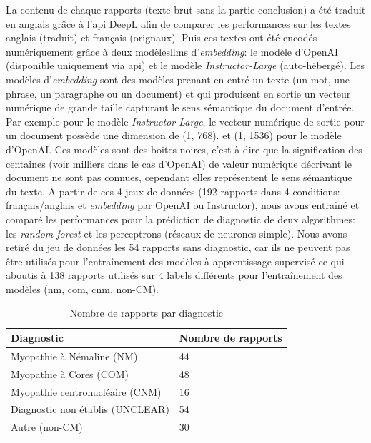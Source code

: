 La contenu de chaque rapports (texte brut sans la partie conclusion) a été traduit en anglais grâce à l'\gls{api} DeepL afin de comparer les performances sur les textes anglais (traduit) et français (orignaux). Puis ces textes ont été encodés numériquement grâce à deux modèles\gls{llms} d'\textit{embedding}: le modèle d'OpenAI (disponible uniquement via \gls{api}) et le modèle \textit{Instructor-Large} (auto-hébergé). Les modèles d'\textit{embedding} sont des modèles prenant en entré un texte (un mot, une phrase, un paragraphe ou un document) et qui produisent en sortie un vecteur numérique de grande taille capturant le sens sémantique du document d'entrée. Par exemple pour le modèle \textit{Instructor-Large}, le vecteur numérique de sortie pour un document possède une dimension de (1, 768). et (1, 1536) pour le modèle d'OpenAI. Ces modèles sont des boites noires, c'est à dire que la signification des centaines (voir milliers dans le cas d'OpenAI) de valeur numérique décrivant le document ne sont pas connues, cependant elles représentent le sens sémantique du texte.
A partir de ces 4 jeux de données (192 rapports dans 4 conditions: français/anglais et \textit{embedding} par OpenAI ou Instructor), nous avons entraîné et comparé les performances pour la prédiction de diagnostic de deux algorithmes: les \textit{random forest} et les perceptrons (réseaux de neurones simple). Nous avons retiré du jeu de données les 54 rapports sans diagnostic, car ils ne peuvent pas être utilisés pour l'entraînement des modèles à apprentissage supervisé ce qui aboutis à 138 rapports utilisés sur 4 labels différents pour l'entraînement des modèles (\gls{nm}, \gls{com}, \gls{cnm}, non-CM).
\begin{table}[ht]
\centering
\caption{Nombre de rapports par diagnostic}
\label{tab:number_patients}
\begin{tabularx}{\textwidth}{|X|X|}
\hline
\textbf{Diagnostic} & \textbf{Nombre de rapports} \\
\hline
Myopathie à Némaline (NM) & 44 \\
\hline
Myopathie à Cores (COM) & 48 \\
\hline
Myopathie centronucléaire (CNM) & 16 \\
\hline
Diagnostic non établis (UNCLEAR) & 54 \\
\hline
Autre (non-CM) & 30 \\
\hline
\end{tabularx}
\end{table}

